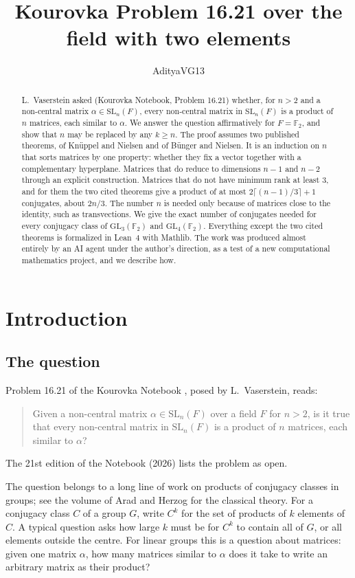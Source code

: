 \documentclass[11pt]{amsart}
\title{Kourovka Problem 16.21 over the field with two elements}
\author{AdityaVG13}
\date{}
\theoremstyle{definition}
\theoremstyle{remark}
\newcommand{\F}{\mathbb{F}_2}
\newcommand{\GL}{\mathrm{GL}}
\newcommand{\SL}{\mathrm{SL}}
\begin{document}
\begin{abstract}
L.~Vaserstein asked (Kourovka Notebook, Problem 16.21) whether, for $n>2$ and a non-central
matrix $\alpha\in\SL_n(F)$, every non-central matrix in $\SL_n(F)$ is a product of $n$ matrices,
each similar to $\alpha$. We answer the question affirmatively for $F=\F$, and show that $n$ may
be replaced by any $k\ge n$. The proof assumes two published theorems, of Kn\"uppel and Nielsen
and of B\"unger and Nielsen. It is an induction on $n$ that sorts matrices by one property:
whether they fix a vector together with a complementary hyperplane. Matrices that do reduce to
dimensions $n-1$ and $n-2$ through an explicit construction. Matrices that do not have minimum
rank at least $3$, and for them the two cited theorems give a product of at most
$2\lceil(n-1)/3\rceil+1$ conjugates, about $2n/3$. The number $n$ is needed only because of
matrices close to the identity, such as transvections. We give the exact number of conjugates
needed for every conjugacy class of $\GL_3(\F)$ and $\GL_4(\F)$. Everything except the two cited
theorems is formalized in Lean~4 with Mathlib. The work was produced almost entirely by an AI agent
under the author's direction, as a test of a new computational mathematics project, and we
describe how.
\end{abstract}

\maketitle

\section{Introduction}

\subsection{The question}
Problem 16.21 of the Kourovka Notebook \cite{Kourovka}, posed by L.~Vaserstein, reads:

\begin{quote}
Given a non-central matrix $\alpha\in\SL_n(F)$ over a field $F$ for $n>2$, is it true that every
non-central matrix in $\SL_n(F)$ is a product of $n$ matrices, each similar to $\alpha$?
\end{quote}

The 21st edition of the Notebook (2026) lists the problem as open.

The question belongs to a long line of work on products of conjugacy classes in groups; see the
volume of Arad and Herzog \cite{AH} for the classical theory. For a conjugacy class $C$ of a group
$G$, write $C^k$ for the set of products of $k$ elements of $C$. A typical question asks how large
$k$ must be for $C^k$ to contain all of $G$, or all elements outside the centre. For linear groups
this is a question about matrices: given one matrix $\alpha$, how many matrices similar to $\alpha$
does it take to write an arbitrary matrix as their product?
\end{document}
